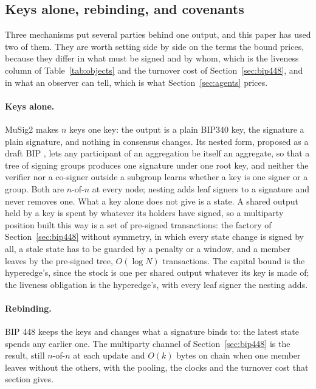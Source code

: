 \documentclass[11pt]{article}
\theoremstyle{plain}
\theoremstyle{definition}
\theoremstyle{remark}
\begin{document}
\subsection{Keys alone, rebinding, and covenants}
\label{sec:keys}

Three mechanisms put several parties behind one output, and this paper has used two of them. They are worth setting side by side on the terms the bound prices, because they differ in what must be signed and by whom, which is the liveness column of Table~\ref{tab:objects} and the turnover cost of Section~\ref{sec:bip448}, and in what an observer can tell, which is what Section~\ref{sec:agents} prices.

\paragraph{Keys alone.} MuSig2 \citep{nick2021musig2,bip327} makes $n$ keys one key: the output is a plain BIP340 key, the signature a plain signature, and nothing in consensus changes. Its nested form, proposed as a draft BIP \citep{bip2297}, lets any participant of an aggregation be itself an aggregate, so that a tree of signing groups produces one signature under one root key, and neither the verifier nor a co-signer outside a subgroup learns whether a key is one signer or a group. Both are $n$-of-$n$ at every node; nesting adds leaf signers to a signature and never removes one. What a key alone does not give is a state. A shared output held by a key is spent by whatever its holders have signed, so a multiparty position built this way is a set of pre-signed transactions: the factory of Section~\ref{sec:bip448} without symmetry, in which every state change is signed by all, a stale state has to be guarded by a penalty or a window, and a member leaves by the pre-signed tree, $O(\log N)$ transactions. The capital bound is the hyperedge's, since the stock is one per shared output whatever its key is made of; the liveness obligation is the hyperedge's, with every leaf signer the nesting adds.

\paragraph{Rebinding.} BIP 448 \citep{bip448} keeps the keys and changes what a signature binds to: the latest state spends any earlier one. The multiparty channel of Section~\ref{sec:bip448} is the result, still $n$-of-$n$ at each update and $O(k)$ bytes on chain when one member leaves without the others, with the pooling, the clocks and the turnover cost that section gives.
\end{document}
